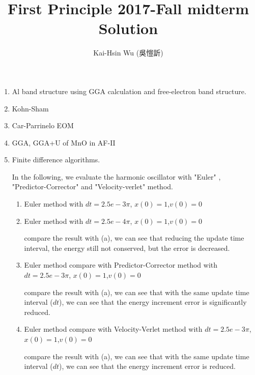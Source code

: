 \documentclass[notitlepage]{revtex4-1}
\begin{document}
\begin{CJK}{UTF8}{bsmi}
\title{First Principle 2017-Fall  midterm Solution}
\author{Kai-Hsin Wu (吳愷訢)}

\maketitle

\begin{enumerate}	
	\item Al band structure using GGA calculation and free-electron band structure.
	
	\item Kohn-Sham
	
	\item Car-Parrinelo EOM
	
	\item GGA, GGA+U of MnO in AF-II

	\item Finite difference algorithms. 
	
		In the following, we evaluate the harmonic oscillator with "Euler" , "Predictor-Corrector" and "Velocity-verlet" method.
		\begin{enumerate}[label=(\alph*)]
		\item Euler method with $dt = 2.5e-3 \pi$, $x(0) = 1$,$v(0) = 0$ 

		\item Euler method with $dt = 2.5e-4 \pi$, $x(0) = 1$,$v(0) = 0$ 
		
		compare the result with (a), we can see that  reducing the update time interval, the energy still not conserved, but the error is decreased. 


		\item Euler method compare with Predictor-Corrector method with $dt = 2.5e-3 \pi$, $x(0) = 1$,$v(0) = 0$ 

		compare the result with (a), we can see that with the same update time interval ($dt$), we can see that the energy increment error is significantly reduced.  

		\item Euler method compare with Velocity-Verlet method with $dt = 2.5e-3 \pi$, $x(0) = 1$,$v(0) = 0$ 
		
		compare the result with (a), we can see that with the same update time interval ($dt$), we can see that the energy increment error is reduced.  

		\end{enumerate}

\end{enumerate}


\end{CJK}



	
\end{document}
